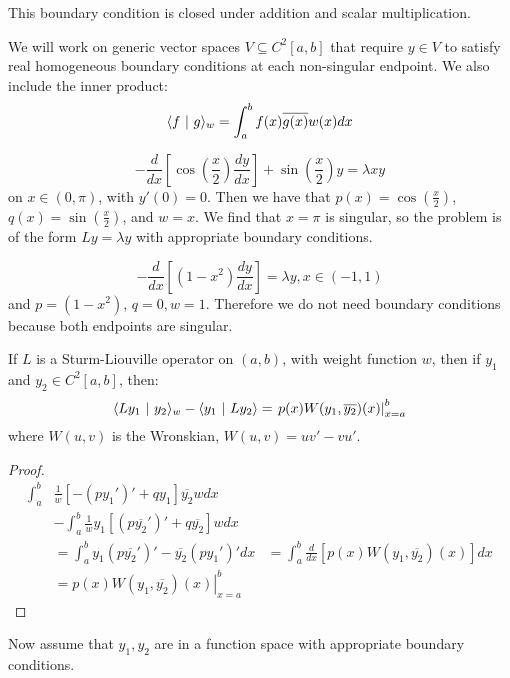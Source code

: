 \documentclass[../Main.tex]{subfiles}
\begin{document}
\begin{remark}
    This boundary condition is closed under addition and scalar multiplication.
\end{remark}
We will work on generic vector spaces $V \subseteq C^2[a, b]$ that require $y \in V$ to satisfy real homogeneous boundary conditions at each non-singular endpoint. We also include the inner product:
\begin{equation*}
    \langle f~\vert~g\rangle_w = \int_{a}^{b} f(x) \overline{g(x)} w(x) dx 
\end{equation*}
\begin{examples}
    \item \begin{equation*}
        -\frac{d}{dx}\left[\cos\left(\frac{x}{2}\right)\frac{dy}{dx}\right] + \sin\left(\frac{x}{2}\right)y = \lambda x y
    \end{equation*}
    on $x \in (0, \pi)$, with $y'(0) = 0$. Then we have that $p(x) = \cos\left(\frac{x}{2}\right)$, $q(x) = \sin\left(\frac{x}{2}\right)$, and $w = x$. We find that $x = \pi$ is singular, so the problem is of the form $Ly = \lambda y$ with appropriate boundary conditions.
    \item \begin{equation*}
        -\frac{d}{dx}\left[(1 - x^2)\frac{dy}{dx}\right] = \lambda y, x \in (-1, 1)
    \end{equation*}
    and $p = (1 - x^2)$, $q = 0, w=1$. Therefore we do not need boundary conditions because both endpoints are singular.
\end{examples}
\begin{proposition}
    If $L$ is a Sturm-Liouville operator on $(a, b)$, with weight function $w$, then if $y_1$ and $y_2 \in C^2[a, b]$, then:
    \begin{equation}
        \langle Ly_1~\vert~y_2\rangle_w - \langle y_1~\vert~Ly_2\rangle = \left. p(x) W(y_1, \overline{y_2})(x)\right|_{x = a}^b
        \label{eqnSLWronskian}
    \end{equation}
    where $W(u, v)$ is the Wronskian, $W(u, v) = uv' - vu'$.
    \label{propSLWronskian}
\end{proposition}
\begin{proof}
    \begin{align*}
        \int_{a}^{b} &\frac{1}{w}\left[-(py_1')' + qy_1\right]\overline{y_2} w dx \\
        &- \int_{a}^{b} \frac{1}{w}y_1\left[ (p\overline{y_2}')' + q\overline{y_2}\right] w dx \\
        &=\int_{a}^{b} y_1 \left(p\overline{y_2}'\right)' - \overline{y_2} \left(py_1'\right)' dx 
        &= \int_{a}^{b} \frac{d}{dx}\left[p(x) W(y_1, \overline{y_2})(x)\right] dx \\
        &= \left.p(x) W(y_1, \overline{y_2})(x)\right|_{x = a}^b
    \end{align*}
\end{proof}
Now assume that $y_1, y_2$ are in a function space with appropriate boundary conditions.
\end{document}
